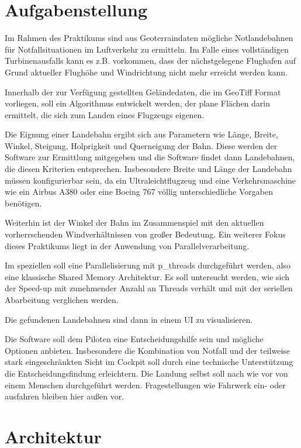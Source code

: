 \documentclass[10pt,a4paper]{report}
\begin{document}
\chapter{Aufgabenstellung}

Im Rahmen des Praktikums sind aus Geoterraindaten mögliche Notlandebahnen für Notfallsituationen im Luftverkehr zu ermitteln. Im Falle eines vollständigen Turbinenausfalls kann es z.B. vorkommen, dass der nächstgelegene Flughafen auf Grund aktueller Flughöhe und Windrichtung nicht mehr erreicht werden kann.

Innerhalb der zur Verfügung gestellten Geländedaten, die im GeoTiff Format vorliegen, soll ein Algorithmus entwickelt werden, der plane Flächen darin ermittelt, die sich zum Landen eines Flugzeugs eigenen.

Die Eignung einer Landebahn ergibt sich aus Parametern wie Länge, Breite, Winkel, Steigung, Holprigkeit und Querneigung der Bahn.
Diese werden der Software zur Ermittlung mitgegeben und die Software findet dann Landebahnen, die diesen Kriterien entsprechen.
Insbesondere Breite und Länge der Landebahn müssen konfigurierbar sein, da ein Ultraleichtflugzeug und eine Verkehrsmaschine wie ein Airbus A380 oder eine Boeing 767 völlig unterschiedliche Vorgaben benötigen.

Weiterhin ist der Winkel der Bahn im Zusammenspiel mit den aktuellen vorherrschenden Windverhältnissen von großer Bedeutung. 
Ein weiterer Fokus dieses Praktikums liegt in der Anwendung von Parallelverarbeitung.

Im speziellen soll eine Parallelisierung mit p\_threads durchgeführt werden, also eine klassische Shared Memory Architektur.
Es soll untersucht werden, wie sich der Speed-up mit zunehmender Anzahl an Threads verhält und mit der seriellen Abarbeitung verglichen werden.

Die gefundenen Landebahnen sind dann in einem UI zu visualisieren.

Die Software soll dem Piloten eine Entscheidungshilfe sein und mögliche Optionen anbieten. Insbesondere die Kombination von Notfall und der teilweise stark eingeschränkten Sicht im Cockpit soll durch eine technische Unterstützung die Entscheidungsfindung erleichtern.
Die Landung selbst soll nach wie vor von einem Menschen durchgeführt werden. Fragestellungen wie Fahrwerk ein- oder ausfahren bleiben hier außen vor.     

\chapter{Architektur}
\end{document}
